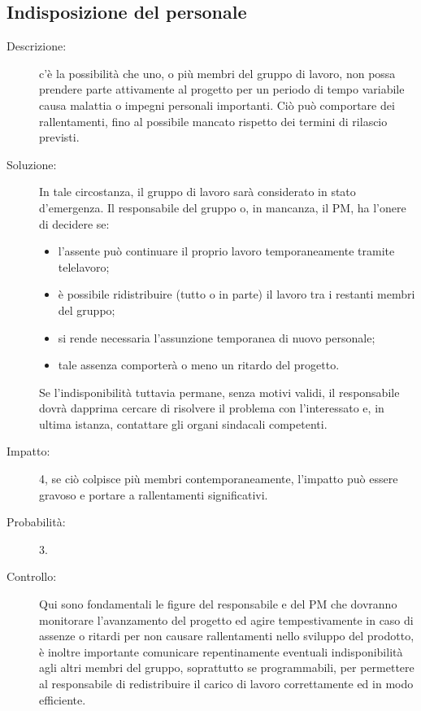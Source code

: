 \subsection{Indisposizione del personale} 
\begin{description}
\item[Descrizione:]c'è la possibilità che uno, o più membri del gruppo di lavoro, non possa prendere parte attivamente al progetto per un periodo di tempo variabile causa malattia o impegni personali importanti. Ciò può comportare dei rallentamenti, fino al possibile mancato rispetto dei termini di rilascio previsti.

\item[Soluzione:] In tale circostanza, il gruppo di lavoro sarà considerato in stato d'emergenza. Il responsabile del gruppo o, in mancanza, il PM, ha l'onere di decidere se:
\begin{itemize}
\item l'assente può continuare il proprio lavoro temporaneamente tramite telelavoro;
\item è possibile ridistribuire (tutto o in parte) il lavoro tra i restanti membri del gruppo;
\item si rende necessaria l'assunzione temporanea di nuovo personale;
\item tale assenza comporterà o meno un ritardo del progetto.
\end{itemize}
Se l'indisponibilità tuttavia permane, senza motivi validi, il responsabile dovrà dapprima cercare di risolvere il problema con l'interessato e, in ultima istanza, contattare gli organi sindacali competenti.
\item[Impatto:] 4, se ciò colpisce più membri contemporaneamente, l'impatto può essere gravoso e portare a rallentamenti significativi.
\item[Probabilità:] 3.
\item[Controllo:] Qui sono fondamentali le figure del responsabile e del PM che dovranno monitorare l'avanzamento del progetto ed agire tempestivamente in caso di assenze o ritardi per non causare rallentamenti nello sviluppo del prodotto, è inoltre importante comunicare repentinamente eventuali indisponibilità agli altri membri del gruppo, soprattutto se programmabili, per permettere al responsabile di redistribuire il carico di lavoro correttamente ed in modo efficiente. 
\end{description}

